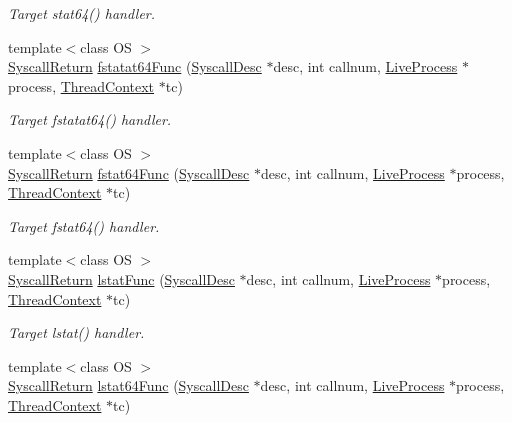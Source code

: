 \begin{DoxyCompactItemize}
\begin{DoxyCompactList}\small\item\em Target stat64() handler. \item\end{DoxyCompactList}\item 
{\footnotesize template$<$class OS $>$ }\\\hyperlink{classSyscallReturn}{SyscallReturn} \hyperlink{syscall__emul_8hh_acc27dba349a051153a090505227b4b9c}{fstatat64Func} (\hyperlink{classSyscallDesc}{SyscallDesc} $\ast$desc, int callnum, \hyperlink{classLiveProcess}{LiveProcess} $\ast$process, \hyperlink{classThreadContext}{ThreadContext} $\ast$tc)
\begin{DoxyCompactList}\small\item\em Target fstatat64() handler. \item\end{DoxyCompactList}\item 
{\footnotesize template$<$class OS $>$ }\\\hyperlink{classSyscallReturn}{SyscallReturn} \hyperlink{syscall__emul_8hh_ac9c78c04e130987fc30d9e84fc2a8be3}{fstat64Func} (\hyperlink{classSyscallDesc}{SyscallDesc} $\ast$desc, int callnum, \hyperlink{classLiveProcess}{LiveProcess} $\ast$process, \hyperlink{classThreadContext}{ThreadContext} $\ast$tc)
\begin{DoxyCompactList}\small\item\em Target fstat64() handler. \item\end{DoxyCompactList}\item 
{\footnotesize template$<$class OS $>$ }\\\hyperlink{classSyscallReturn}{SyscallReturn} \hyperlink{syscall__emul_8hh_a720a371d0fcbe5f6ef57bee91d7fe238}{lstatFunc} (\hyperlink{classSyscallDesc}{SyscallDesc} $\ast$desc, int callnum, \hyperlink{classLiveProcess}{LiveProcess} $\ast$process, \hyperlink{classThreadContext}{ThreadContext} $\ast$tc)
\begin{DoxyCompactList}\small\item\em Target lstat() handler. \item\end{DoxyCompactList}\item 
{\footnotesize template$<$class OS $>$ }\\\hyperlink{classSyscallReturn}{SyscallReturn} \hyperlink{syscall__emul_8hh_a6a65e067e9f7873eb4153258df5b34e0}{lstat64Func} (\hyperlink{classSyscallDesc}{SyscallDesc} $\ast$desc, int callnum, \hyperlink{classLiveProcess}{LiveProcess} $\ast$process, \hyperlink{classThreadContext}{ThreadContext} $\ast$tc)

\end{DoxyCompactItemize}
